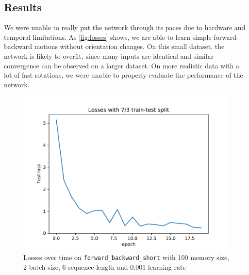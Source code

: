 \documentclass[a4paper,11pt]{article}
\begin{document}
\subsection{Results}
\label{sec:evaluation:results}

We were unable to really put the network through its paces due to hardware and
temporal limitations. As \autoref{fig:losses} shows, we are able to learn simple
forward-backward motions without orientation changes. On this small dataset, the
network is likely to overfit, since many inputs are identical and similar convergence can be
observed on a larger dataset. On more realistic data with a lot of fast
rotations, we were unable to properly evaluate the performance of the network.

\begin{figure}
    \centering
    \includegraphics[width=0.8\linewidth]{losses.pdf}
    \caption{Losses over time on \texttt{forward\_backward\_short} with 100
    memory size, 2 batch size, 6 sequence length and 0.001 learning rate}
    \label{fig:losses}
\end{figure}



\newpage
\printbibliography
\end{document}
